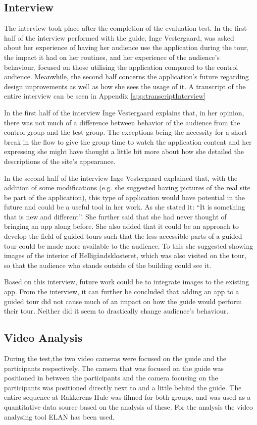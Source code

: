 \subsection{Interview}
The interview took place after the completion of the evaluation test. In the first half of the interview performed with the guide, Inge Vestergaard, was asked about her experience of having her audience use the application during the tour, the impact it had on her routines, and her experience of the audience’s behaviour, focused on those utilising the application compared to the control audience. Meanwhile, the second half concerns the application’s future regarding design improvements as well as how she sees the usage of it. A transcript of the entire interview can be seen in Appendix \ref{app:transcriptInterview}

In the first half of the interview Inge Vestergaard explains that, in her opinion, there was not much of a difference between behavior of the audience from the control group and the test group. The exceptions being the necessity for a short break in the flow to give the group time to watch the application content and her expressing she might have thought a little bit more about how she detailed the descriptions of the site’s appearance.     

In the second half of the interview Inge Vestergaard explained that, with the addition of some modifications (e.g. she suggested having pictures of the real site be part of the application), this type of application would have potential in the future and could be a useful tool in her work. As she stated it: “It is something that is new and different”. She further said that she had never thought of bringing an app along before. She also added that it could be an approach to develop the field of guided tours such that the less accessible parts of a guided tour could be made more available to the audience. To this she suggested showing images of the interior of Helligåndsklosteret, which was also visited on the tour, so that the audience who stands outside of the building could see it.

Based on this interview, future work could be to integrate images to the existing app. From the interview, it can further be concluded that adding an app to a guided tour did not cause much of an impact on how the guide would perform their tour. Neither did it seem to drastically change audience’s behaviour. 

\subsection{Video Analysis}
During the test,the two video cameras were focused on the guide and the participants respectively. The camera that was focused on the guide was positioned in between the participants and the camera focusing on the participants was positioned directly next to and a little behind the guide. The entire sequence at Rakkerens Hule was filmed for both groups, and was used as a quantitative data source based on the analysis of these. For the analysis the video analysing tool ELAN has been used. 

